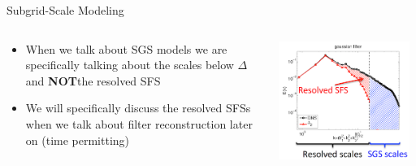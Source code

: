 
\begin{frame}{Subgrid-Scale Modeling}

\begin{columns}[T]
    \begin{column}{.6\textwidth}
      \begin{minipage}[c][.6\textheight][c]{\linewidth}
      \begin{itemize}
      \item When we talk about SGS models we are specifically talking about the scales below $\Delta$ and \textbf{NOT}the resolved SFS
      \item We will specifically discuss the resolved SFSs when we talk about filter reconstruction later on (time permitting)
      \end{itemize}
      \end{minipage}
    \end{column}
    \begin{column}{.6\textwidth}
    \includegraphics[width=0.95\textwidth]{decomp1}
    \end{column}
  \end{columns}

\end{frame}


